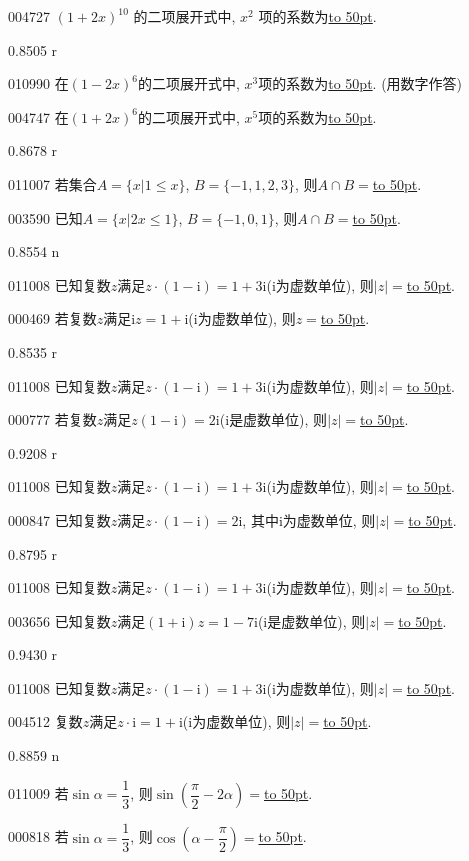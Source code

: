 \documentclass[10pt,a4paper]{article}
\newcommand{\blank}[1]{\underline{\hbox to #1pt{}}}
\begin{document}
004727	$(1+2x)^{10}$ 的二项展开式中, $x^2$ 项的系数为\blank{50}.

0.8505 r

010990	在$(1-2x)^6$的二项展开式中, $x^3$项的系数为\blank{50}. (用数字作答)

004747	在$(1+2x)^6$的二项展开式中, $x^5$项的系数为\blank{50}.

0.8678 r

011007	若集合$A=\{x|1\le x\}$, $B=\{-1,1,2,3\}$, 则$A\cap B=$\blank{50}.

003590	已知$A=\{x|2x\le 1\}$, $B=\{-1,0,1\}$, 则$A\cap B=$\blank{50}.

0.8554 n

011008	已知复数$z$满足$z\cdot (1-\mathrm{i})=1+3\mathrm{i}$($\mathrm{i}$为虚数单位), 则$|z|=$\blank{50}.

000469	若复数$z$满足$\mathrm{i}z=1+\mathrm{i}$($\mathrm{i}$为虚数单位), 则$z=$\blank{50}.

0.8535 r

011008	已知复数$z$满足$z\cdot (1-\mathrm{i})=1+3\mathrm{i}$($\mathrm{i}$为虚数单位), 则$|z|=$\blank{50}.

000777	若复数$z$满足$z(1-\mathrm{i})=2 \mathrm{i}$($\mathrm{i}$是虚数单位), 则$|z|=$\blank{50}.

0.9208 r

011008	已知复数$z$满足$z\cdot (1-\mathrm{i})=1+3\mathrm{i}$($\mathrm{i}$为虚数单位), 则$|z|=$\blank{50}.

000847	已知复数$z$满足$z\cdot (1-\mathrm{i})=2\mathrm{i}$, 其中$\mathrm{i}$为虚数单位, 则$|z|=$\blank{50}.

0.8795 r

011008	已知复数$z$满足$z\cdot (1-\mathrm{i})=1+3\mathrm{i}$($\mathrm{i}$为虚数单位), 则$|z|=$\blank{50}.

003656	已知复数$z$满足$(1+\mathrm{i})z=1-7\mathrm{i}$($\mathrm{i}$是虚数单位), 则$|z|=$\blank{50}.

0.9430 r

011008	已知复数$z$满足$z\cdot (1-\mathrm{i})=1+3\mathrm{i}$($\mathrm{i}$为虚数单位), 则$|z|=$\blank{50}.

004512	复数$z$满足$z\cdot \mathrm{i}=1+\mathrm{i}$($\mathrm{i}$为虚数单位), 则$|z|=$\blank{50}.

0.8859 n

011009	若$\sin \alpha =\dfrac 13$, 则$\sin (\dfrac \pi 2-2\alpha)=$\blank{50}.

000818	若$\sin\alpha =\dfrac13$, 则$\cos(\alpha -\dfrac{\pi}2)=$\blank{50}.
\end{document}
